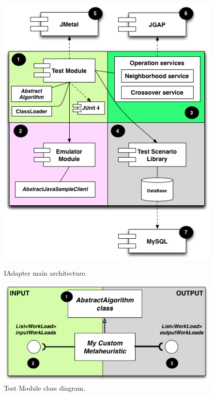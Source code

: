\documentclass[espaco=umemeio,chapter=TITLE,twoside,openright]{abnt}
\begin{document}
\begin{figure}[h]
\begin{minipage}{.5\textwidth}
\centering
\includegraphics[width=1\textwidth]{./images/testbedarch.png}
\caption{IAdapter main architecture.}
\label{fig:testbedarch}
\end{minipage}
\begin{minipage}{.5\textwidth}
\centering
\includegraphics[width=1\textwidth]{./images/myheuristic.png}
\caption{Test Module class diagram.}
\label{fig:heuristicclassdiagram}
\end{minipage}
\end{figure}
\end{document}

